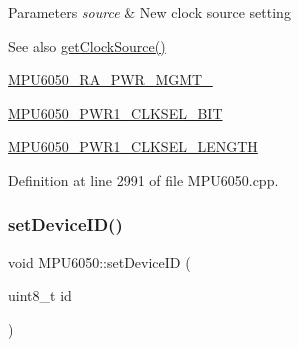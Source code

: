 \begin{DoxyParams}{Parameters}
{\em source} & New clock source setting \\
\hline
\end{DoxyParams}
\begin{DoxySeeAlso}{See also}
\mbox{\hyperlink{classMPU6050_a8ed670258a805807b5102cdc5d0996a8}{get\+Clock\+Source()}} 

\mbox{\hyperlink{MPU6050_8h_ac6c83146165a2307ac7155d4fa566df4}{M\+P\+U6050\+\_\+\+R\+A\+\_\+\+P\+W\+R\+\_\+\+M\+G\+M\+T\+\_}} 

\mbox{\hyperlink{MPU6050_8h_a77a4abb41f9adaa799cccf6402443cb9}{M\+P\+U6050\+\_\+\+P\+W\+R1\+\_\+\+C\+L\+K\+S\+E\+L\+\_\+\+B\+IT}} 

\mbox{\hyperlink{MPU6050_8h_a211c99bb94df09b85cf838b2a5eb7167}{M\+P\+U6050\+\_\+\+P\+W\+R1\+\_\+\+C\+L\+K\+S\+E\+L\+\_\+\+L\+E\+N\+G\+TH}} 
\end{DoxySeeAlso}


Definition at line 2991 of file M\+P\+U6050.\+cpp.


\begin{DoxyCode}{0}

\end{DoxyCode}
\mbox{\label{classMPU6050_aaefb4b3d93cf4b78d56cd63b10ea0e97}} 
\subsubsection{\texorpdfstring{setDeviceID()}{setDeviceID()}}
{\footnotesize\ttfamily void M\+P\+U6050\+::set\+Device\+ID (\begin{DoxyParamCaption}\item[{uint8\+\_\+t}]{id }\end{DoxyParamCaption})}

